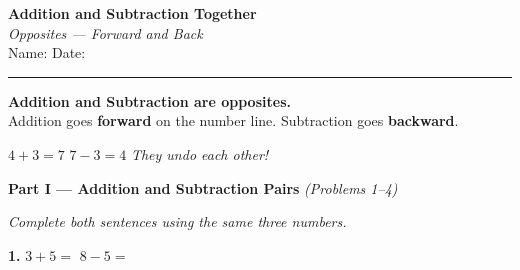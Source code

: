 \documentclass[12pt, letterpaper]{article}
\newcommand{\answerline}{\underline{\hspace{2.5cm}}}
\newcommand{\biganswerline}{\underline{\hspace{4cm}}}
\newcommand{\numbox}{\fbox{\hspace{0.6cm}\vphantom{0}}}
\begin{document}
\begin{center}
  {\LARGE\textbf{\textcolor{scholared}{Addition and Subtraction Together}}}\\[4pt]
  {\Large\textcolor{scholagold}{\textit{Opposites — Forward and Back}}}\\[6pt]
  {\small Name: \biganswerline \hspace{1cm} Date: \answerline}
\end{center}

\vspace{4pt}
\noindent\textcolor{scholared}{\rule{\linewidth}{1pt}}
\vspace{4pt}


\begin{lessonbox}
\textbf{Addition and Subtraction are opposites.}\\[4pt]
Addition goes \textbf{forward} on the number line. Subtraction goes \textbf{backward}.\\[6pt]
\begin{center}
\end{center}
\medskip
$4 + 3 = 7$ \hspace{1cm} $7 - 3 = 4$ \hspace{1cm} \textit{They undo each other!}
\end{lessonbox}

\bigskip

\noindent\textcolor{scholared}{\large\textbf{Part I — Addition and Subtraction Pairs}} \hfill \textit{(Problems 1–4)}

\medskip\noindent\textit{Complete both sentences using the same three numbers.}

\bigskip
\noindent\textbf{1.} \quad $3 + 5 = $ \numbox \hspace{2cm} $8 - 5 = $ \numbox
\end{document}
